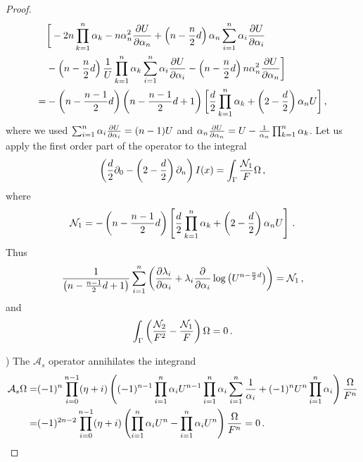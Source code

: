 \documentclass[10pt,a4paper]{amsart}
\begin{document}
\begin{proof}
\begin{align}
\begin{split}
&\bigg[  
-2n\prod_{k=1}^{n}\alpha_{k} -n\alpha_{n}^{2}\frac{\partial {\rm U}}{\partial \alpha_{n}} + \left( n -\frac{n}{2}d \right)\alpha_{n}\sum_{i=1}^{n} \alpha_{i} \frac{\partial {\rm U}}{\partial \alpha_{i}} \\
&- \left( n -\frac{n}{2}d \right)\frac{1}{{\rm U}}\prod_{k=1}^{n} \alpha_{k} \sum_{i=1}^{n} \alpha_{i} \frac{\partial {\rm U}}{\partial \alpha_{i}} - \left( n -\frac{n}{2}d \right) n \alpha_{n}^{2} \frac{\partial {\rm U}}{\partial \alpha_{n}}
\bigg]  \\=
&-\left( n -\frac{n-1}{2}d \right) \left( n -\frac{n-1}{2}d +1 \right) \bigg[
\frac{d}{2}\prod_{k=1}^{n} \alpha_{k} + \left( 2 - \frac{d}{2} \right) \alpha_{n} {\rm U}
\bigg] \,,
\end{split}
\end{align}
where we used $\sum_{i=1}^{n}\alpha_{i} \frac{\partial {\rm U}}{\partial \alpha_{i}} = (n-1) {\rm U}$ and $\alpha_{n}\frac{\partial {\rm U}}{\partial \alpha_{n}} = {\rm U} - \frac{1}{\alpha_{n}}\prod_{k=1}^{n}\alpha_{k}$. 
Let us apply the first order part of the operator to the integral
\begin{align}
\left( \frac{d}{2} \partial_{0} - \left( 2 - \frac{d}{2} \right) \partial_{n} \right) I(x) = \int_{\Gamma} \frac{\mathcal{N}_{1}}{{\rm F}} \Omega \,, 
\end{align}
where
\begin{align}
\mathcal{N}_{1} = - \left( n - \frac{n-1}{2}d \right) \left[
\frac{d}{2} \prod_{k=1}^{n} \alpha_{k} + \left( 2-\frac{d}{2} \right)\alpha_{n} {\rm U}
\right] \,.
\end{align}
Thus
\begin{align}
\frac{1}{\left( n -\frac{n-1}{2}d +1 \right)}\sum_{i=1}^{n} \left( \frac{\partial \lambda_{i}}{\partial \alpha_{i}} + \lambda_{i} \frac{\partial}{\partial \alpha_{i}} \log\left( {\rm U}^{n - \frac{n}{2}d}\right) \right) = \mathcal{N}_{1} \,,   
\end{align}
and
\begin{align}
\int_{\Gamma} \left( \frac{\mathcal{N}_{2}}{{\rm F}^{2}} - \frac{\mathcal{N}_{1}}{{\rm F}} \right) \Omega  = 0 \,.   
\end{align}

) The $\mathcal{A}_{s}$ operator annihilates the integrand
\begin{align}
\begin{split}
\mathcal{A}_{s} \Omega =& (-1)^{n} \prod_{i=0}^{n-1}(\eta + i) \left( (-1)^{n-1}\prod_{i=1}^{n} \alpha_{i} {\rm U}^{n-1} \prod_{i=1}^{n}\alpha_{i}\sum_{i=1}^{n}\frac{1}{\alpha_{i}} + (-1)^{n} {\rm U}^{n} \prod_{i=1}^{n} \alpha_{i} \right) \frac{\Omega}{{\rm F}^{n}}  \\
=&(-1)^{2n-2}\prod_{i=0}^{n-1}(\eta +i) \left( \prod_{i=1}^{n}\alpha_{i}{\rm U}^{n} - \prod_{i=1}^{n}\alpha_{i}{\rm U}^{n}  \right) \frac{\Omega}{{\rm F}^{n}} = 0 \,.
\end{split}
\end{align}
\end{proof}
\end{document}
